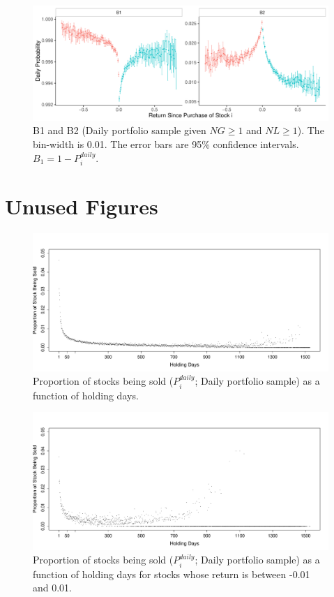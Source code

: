 \documentclass[11pt, a4paper]{article}
\begin{document}
\begin{appendices}
\begin{figure}[H]
	\centering
	\includegraphics[width=1\columnwidth]{barc_B12_NG1_NL1_3.pdf}
	\caption{\small B1 and B2 (Daily portfolio sample given $NG\geq1$ and $NL\geq1$). The bin-width is 0.01. The error bars are 95\% confidence intervals. $B_{1}=1-P^{daily}_{i}$.}
	\label{figure:prop_B12_NG1NL1}
\end{figure}

\clearpage

\section{Unused Figures}


\begin{figure}[H]
	\centering
	\includegraphics[width=0.8\columnwidth]{barc_prop_holding_days.pdf}
	\caption{Proportion of stocks being sold ($P^{daily}_{i}$; Daily portfolio sample) as a function of holding days.}
	\label{figure:prop_on_days}
\end{figure}

\begin{figure}[H]
	\centering
	\includegraphics[width=0.8\columnwidth]{barc_prop_holding_days_around_zero.pdf}
	\caption{Proportion of stocks being sold ($P^{daily}_{i}$; Daily portfolio sample) as a function of holding days for stocks whose return is between -0.01 and 0.01.}
	\label{figure:prop_on_days_around_zero}
\end{figure}


\end{appendices}
\end{document}
